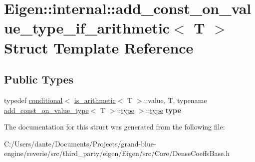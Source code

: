 \hypertarget{struct_eigen_1_1internal_1_1add__const__on__value__type__if__arithmetic}{}\section{Eigen\+::internal\+::add\+\_\+const\+\_\+on\+\_\+value\+\_\+type\+\_\+if\+\_\+arithmetic$<$ T $>$ Struct Template Reference}
\label{struct_eigen_1_1internal_1_1add__const__on__value__type__if__arithmetic}
\subsection*{Public Types}
\begin{DoxyCompactItemize}
\item 
\mbox{\label{struct_eigen_1_1internal_1_1add__const__on__value__type__if__arithmetic_a04d1c7ab227090e635f5f986fa356c7d}} 
typedef \mbox{\hyperlink{struct_eigen_1_1internal_1_1conditional}{conditional}}$<$ \mbox{\hyperlink{struct_eigen_1_1internal_1_1is__arithmetic}{is\+\_\+arithmetic}}$<$ T $>$\+::value, T, typename \mbox{\hyperlink{struct_eigen_1_1internal_1_1add__const__on__value__type}{add\+\_\+const\+\_\+on\+\_\+value\+\_\+type}}$<$ T $>$\+::\mbox{\hyperlink{struct_eigen_1_1internal_1_1true__type}{type}} $>$\+::\mbox{\hyperlink{struct_eigen_1_1internal_1_1true__type}{type}} {\bfseries type}
\end{DoxyCompactItemize}


The documentation for this struct was generated from the following file\+:\begin{DoxyCompactItemize}
\item 
C\+:/\+Users/dante/\+Documents/\+Projects/grand-\/blue-\/engine/reverie/src/third\+\_\+party/eigen/\+Eigen/src/\+Core/Dense\+Coeffs\+Base.\+h\end{DoxyCompactItemize}
